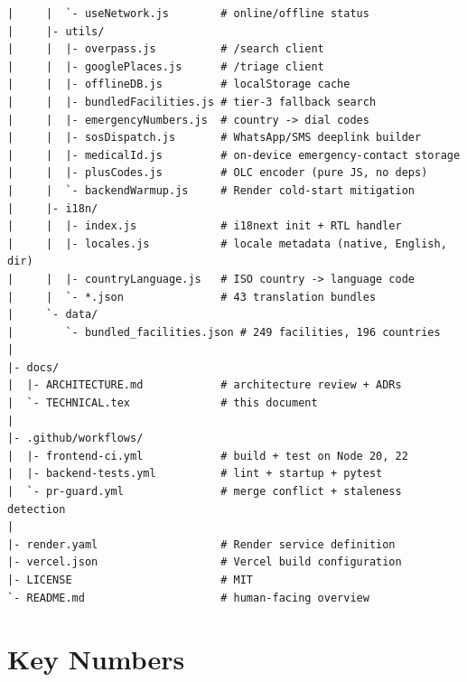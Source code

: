 \documentclass[11pt, a4paper]{article}
\begin{document}
\begin{lstlisting}[language={},numbers=none,frame=none]
|     |  `- useNetwork.js        # online/offline status
|     |- utils/
|     |  |- overpass.js          # /search client
|     |  |- googlePlaces.js      # /triage client
|     |  |- offlineDB.js         # localStorage cache
|     |  |- bundledFacilities.js # tier-3 fallback search
|     |  |- emergencyNumbers.js  # country -> dial codes
|     |  |- sosDispatch.js       # WhatsApp/SMS deeplink builder
|     |  |- medicalId.js         # on-device emergency-contact storage
|     |  |- plusCodes.js         # OLC encoder (pure JS, no deps)
|     |  `- backendWarmup.js     # Render cold-start mitigation
|     |- i18n/
|     |  |- index.js             # i18next init + RTL handler
|     |  |- locales.js           # locale metadata (native, English, dir)
|     |  |- countryLanguage.js   # ISO country -> language code
|     |  `- *.json               # 43 translation bundles
|     `- data/
|        `- bundled_facilities.json # 249 facilities, 196 countries
|
|- docs/
|  |- ARCHITECTURE.md            # architecture review + ADRs
|  `- TECHNICAL.tex              # this document
|
|- .github/workflows/
|  |- frontend-ci.yml            # build + test on Node 20, 22
|  |- backend-tests.yml          # lint + startup + pytest
|  `- pr-guard.yml               # merge conflict + staleness detection
|
|- render.yaml                   # Render service definition
|- vercel.json                   # Vercel build configuration
|- LICENSE                       # MIT
`- README.md                     # human-facing overview
\end{lstlisting}

\section{Key Numbers}
\end{document}
